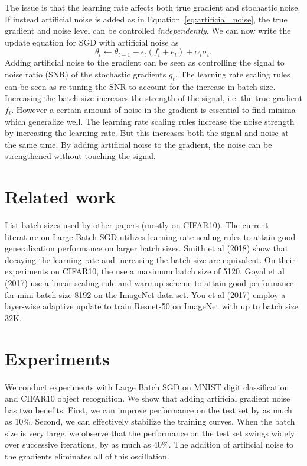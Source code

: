 \documentclass{article} %
\begin{document}
The issue is that the learning rate affects both true gradient and stochastic noise.
If instead artificial noise is added as in Equation~\ref{eq:artificial_noise}, the true gradient and noise level can be controlled \emph{independently}.
We can now write the update equation for SGD with artificial noise as 
\begin{equation*}
\theta_t \gets \theta_{t-1} - \epsilon_t ( f_t + e_t ) + \alpha_t \sigma_t.
\end{equation*}
Adding artificial noise to the gradient can be seen as controlling the signal to noise ratio (SNR) of the stochastic gradients $g_t$.
The learning rate scaling rules can be seen as re-tuning the SNR to account for the increase in batch size.
Increasing the batch size increases the strength of the signal, i.e. the true gradient $f_t$.
However a certain amount of noise in the gradient is essential to find minima which generalize well.
The learning rate scaling rules increase the noise strength by increasing the learning rate.
But this increases both the signal and noise at the same time.
By adding artificial noise to the gradient, the noise can be strengthened without touching the signal.

\section{Related work}
List batch sizes used by other papers (mostly on CIFAR10).
The current literature on Large Batch SGD utilizes learning rate scaling rules to attain good generalization performance on larger batch sizes.
Smith et al (2018) show that decaying the learning rate and increasing the batch size are equivalent.
On their experiments on CIFAR10, the use a maximum batch size of 5120.
Goyal et al (2017) use a linear scaling rule and warmup scheme to attain good performance for mini-batch size 8192 on the ImageNet data set.
You et al (2017) employ a layer-wise adaptive update to train Resnet-50 on ImageNet with up to batch size 32K.

\section{Experiments}
We conduct experiments with Large Batch SGD on MNIST digit classification and CIFAR10 object recognition.
We show that adding artificial gradient noise has two benefits.
First, we can improve performance on the test set by as much as 10\%.
Second, we can effectively stabilize the training curves.
When the batch size is very large, we observe that the performance on the test set swings widely over successive iterations, by as much as 40\%.
The addition of artificial noise to the gradients eliminates all of this oscillation.
\end{document}
